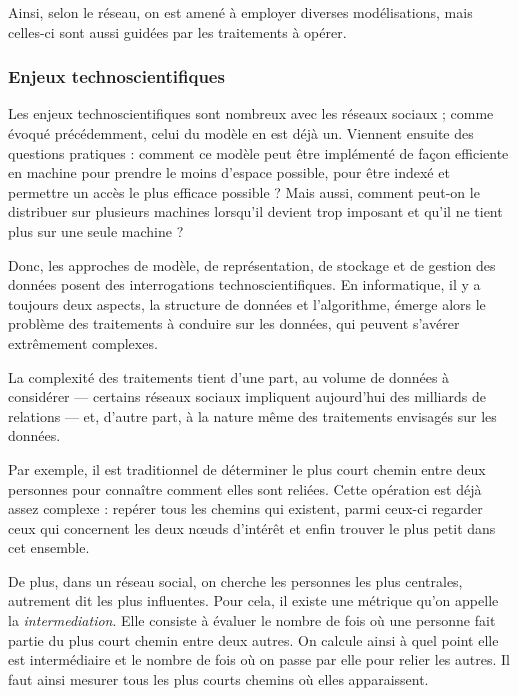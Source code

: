 Ainsi, selon le réseau, on est amené à employer diverses modélisations, mais celles-ci sont aussi guidées par les traitements à opérer.



\subsubsection[Enjeux]{Enjeux technoscientifiques}
\label{subsub:II.1.1.4}

Les enjeux technoscientifiques sont nombreux avec les réseaux sociaux ; comme évoqué précédemment, celui du modèle en est déjà un. Viennent ensuite des questions pratiques : comment ce modèle peut être implémenté de façon efficiente en machine pour prendre le moins d'espace possible, pour être indexé et permettre un accès le plus efficace possible ? Mais aussi, comment peut-on le distribuer sur plusieurs machines lorsqu'il devient trop imposant et qu'il ne tient plus sur une seule machine ? 

Donc, les approches de modèle, de représentation, de stockage et de gestion des données posent des interrogations technoscientifiques. En informatique, il y a toujours deux aspects, la structure de données et l'algorithme, émerge alors le problème des traitements à conduire sur les données, qui peuvent s'avérer extrêmement complexes. 

La complexité des traitements tient d'une part, au volume de données à considérer --- certains réseaux sociaux impliquent aujourd'hui des milliards de relations --- et, d'autre part, à la nature même des traitements envisagés sur les données.

Par exemple, il est traditionnel de déterminer le plus court chemin entre deux personnes pour connaître comment elles sont reliées. Cette opération est déjà assez complexe : repérer tous les chemins qui existent, parmi ceux-ci regarder ceux qui concernent les deux nœuds d'intérêt et enfin trouver le plus petit dans cet ensemble. 

De plus, dans un réseau social, on cherche les personnes les plus centrales, autrement dit les plus influentes. Pour cela, il existe une métrique qu'on appelle la \emph{\gls{intermediation}}. Elle consiste à évaluer le nombre de fois où une personne fait partie du plus court chemin entre deux autres. On calcule ainsi à quel point elle est intermédiaire et le nombre de fois où on passe par elle pour relier les autres. Il faut ainsi mesurer tous les plus courts chemins où elles apparaissent. 

